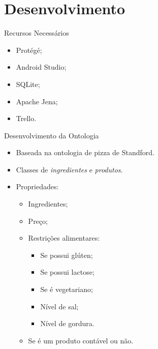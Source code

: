 \section{Desenvolvimento}\label{sec:desenvolvimento}
\begin{frame}[allowframebreaks]{Recursos Necessários}
	\begin{itemize}
		\setlength{\itemsep}{0.5em}
		\item<1-> Protégé;
		\item<1-> Android Studio;
		\item<1-> SQLite;
		\item<1-> Apache Jena;
		\item<1-> Trello.
	\end{itemize}
\end{frame}

\begin{frame}[allowframebreaks]{Desenvolvimento da Ontologia}
	\begin{itemize}
		\setlength{\itemsep}{0.5em}
		\item<1-> Baseada na ontologia de pizza de Standford.
		\item<1-> Classes de \textit{ingredientes} e \textit{produtos}.
		\item<1-> Propriedades:
		\begin{itemize}
			\setlength{\itemsep}{0.5em}
			\item<1-> Ingredientes;
			\item<1-> Preço;
			\item<1-> Restrições alimentares:
			\begin{itemize}
				\setlength{\itemsep}{0.5em}
				\item<1-> Se possui glúten;
				\item<1-> Se possui lactose;
				\item<1-> Se é vegetariano;
				\item<1-> Nível de sal;
				\item<1-> Nível de gordura.				
			\end{itemize}
			\item<1-> Se é um produto contável ou não.
		\end{itemize}
	\end{itemize}
\end{frame}